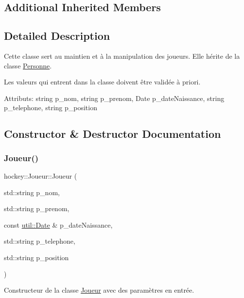 \subsection*{Additional Inherited Members}


\subsection{Detailed Description}
Cette classe sert au maintien et à la manipulation des joueurs. Elle hérite de la classe \hyperlink{classhockey_1_1Personne}{Personne}. 

Les valeurs qui entrent dans la classe doivent être validée à priori. 

Attributs\+: string p\+\_\+nom, string p\+\_\+prenom, Date p\+\_\+date\+Naissance, string p\+\_\+telephone, string p\+\_\+position 

\subsection{Constructor \& Destructor Documentation}
\mbox{\label{classhockey_1_1Joueur_a07cc484db0a5b94fb425aff475c123e2}} 
\subsubsection{\texorpdfstring{Joueur()}{Joueur()}}
{\footnotesize\ttfamily hockey\+::\+Joueur\+::\+Joueur (\begin{DoxyParamCaption}\item[{std\+::string}]{p\+\_\+nom,  }\item[{std\+::string}]{p\+\_\+prenom,  }\item[{const \hyperlink{classutil_1_1Date}{util\+::\+Date} \&}]{p\+\_\+date\+Naissance,  }\item[{std\+::string}]{p\+\_\+telephone,  }\item[{std\+::string}]{p\+\_\+position }\end{DoxyParamCaption})}



Constructeur de la classe \hyperlink{classhockey_1_1Joueur}{Joueur} avec des paramètres en entrée. 


